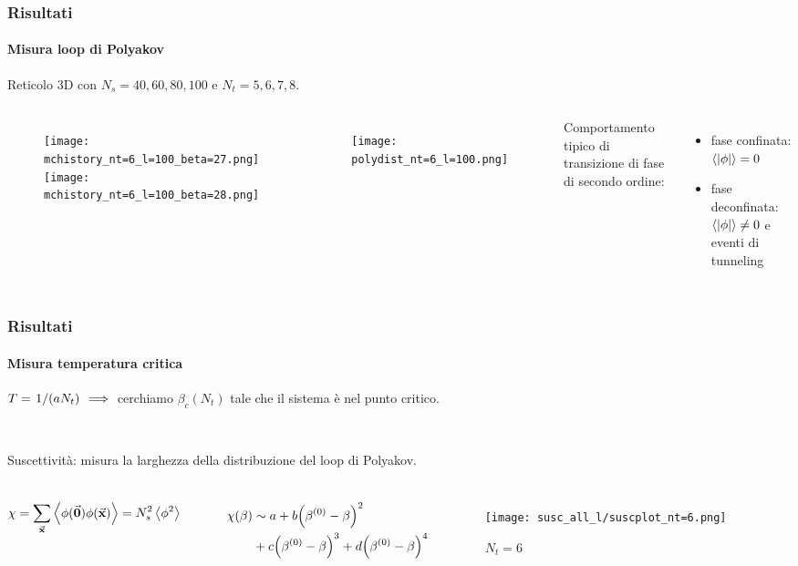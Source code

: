 \documentclass{beamer}
\begin{document}
\begin{frame}
	\frametitle{Risultati}
	\framesubtitle{Misura loop di Polyakov}

	Reticolo 3D con \alert{$N_s = 40,60,80,100$} e \alert{$N_t = 5,6,7,8$}.

	\begin{columns}
			\begin{figure}[h]
				\centering
				\vspace{-1em}
				\texttt{[image: mchistory\_nt=6\_l=100\_beta=27.png]}
				\texttt{[image: mchistory\_nt=6\_l=100\_beta=28.png]}
			\end{figure}
			
			\begin{figure}[h]
				\texttt{[image: polydist\_nt=6\_l=100.png]}
			\end{figure}

			Comportamento tipico di transizione di fase di secondo ordine:
			\begin{itemize}
				\item fase confinata: $\expval{|\phi|} = 0$
				\item fase deconfinata: $\expval{|\phi|} \ne 0$ e \alert{eventi di tunneling}
			\end{itemize}
			
	\end{columns}
	

\end{frame}

\begin{frame}
	\frametitle{Risultati}
	\framesubtitle{Misura temperatura critica}

	$T = \flatfrac{1}{(a N_t)} \implies$ cerchiamo $\beta_c(N_t)$ tale che il sistema è nel punto critico.

	\

	\alert{Suscettività}: misura la larghezza della distribuzione del loop di Polyakov.

	\begin{columns}
		\column{0.45\textwidth}
			\begin{equation*}
				\chi = \sum_{\va{x}} \expval{\phi(\va{0}) \phi(\va{x})} = N_s^2 \expval{\phi^2}
			\end{equation*}
		
			\

			\begin{equation*}
				\begin{aligned}
					\chi(\beta) &\sim a + b\qty(\beta^{(0)} - \beta)^2 \\
					&+ c\qty(\beta^{(0)} - \beta)^3 + d\qty(\beta^{(0)} - \beta)^4					
				\end{aligned}
			\end{equation*}


		\column{0.55\textwidth}
		\begin{figure}[h]
				\texttt{[image: susc\_all\_l/suscplot\_nt=6.png]}
				\caption{$N_t = 6$}
			\end{figure}
						
	\end{columns}
\end{frame}
\end{document}
